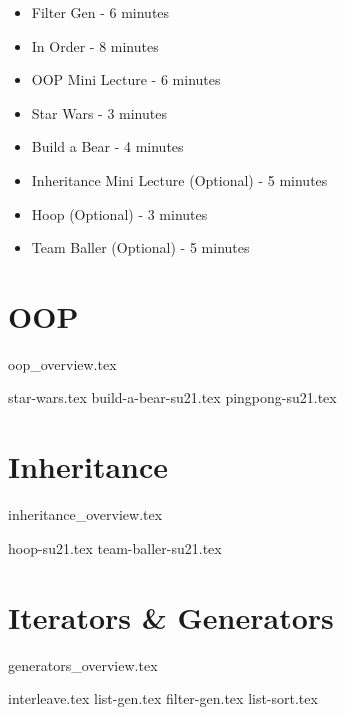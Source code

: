 \documentclass{exam}
\begin{document}
\begin{guide}
\begin{itemize}
\begin{itemize}
            \item Filter Gen - 6 minutes
            \item In Order - 8 minutes
            \item OOP Mini Lecture - 6 minutes
            \item Star Wars - 3 minutes
            \item Build a Bear - 4 minutes
            \item Inheritance Mini Lecture (Optional) - 5 minutes
            \item Hoop (Optional) - 3 minutes
            \item Team Baller (Optional) - 5 minutes
        \end{itemize}
    \end{itemize}
\end{guide}

\section{OOP}
{oop_overview.tex}
\newpage
\begin{questions}
{star-wars.tex}
{build-a-bear-su21.tex}
{pingpong-su21.tex}
\end{questions}

\newpage
\section{Inheritance}
{inheritance_overview.tex}
\begin{questions}
{hoop-su21.tex}
{team-baller-su21.tex}
\end{questions}

\newpage
\section{Iterators \& Generators}
{generators_overview.tex}
\begin{questions}
{interleave.tex}
\newpage
{list-gen.tex}
{filter-gen.tex}
\newpage
{list-sort.tex}
\end{questions}
\end{document}
